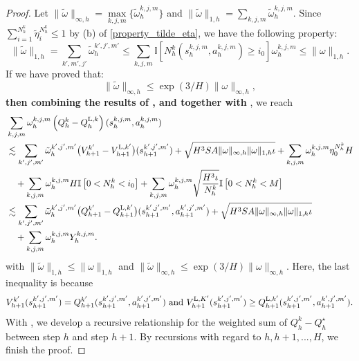 \documentclass{article}
\newcommand{\LL}{\textnormal{L}}
\begin{document}
\begin{proof}
Let $\|\tilde{\omega}\|_{\infty,h} = \mathop{\max}\limits_{k,j,m}\{\tilde{\omega}_{h}^{k, j, m}\}$ and $\|\tilde{\omega}\|_{1,h} = \sum_{k,j,m}\tilde{\omega}_{h}^{k, j, m}$. Since $\sum_{i = 1}^{N_h^k}\tilde{\eta}_i^{N_h^k} \leq 1$ by (b) of \cref{property_tilde_eta}, we have the following property:
\begin{equation*}
    \|\tilde{\omega}\|_{1,h} = \sum_{k',m',j'}\tilde{\omega}_{h}^{k',j',m'} \leq \sum_{k,j,m}\mathbb{I}\left[N_h^k(s_{h}^{k,j,m},a_{h}^{k,j,m}) \geq i_0 \right]\omega_{h}^{k,j,m} \leq \|\omega\|_{1,h}.
\end{equation*}
If we have proved that:
\begin{equation}
    \label{infty}
    \|\tilde{\omega}\|_{\infty,h} \leq \exp(3/H)\|\omega\|_{\infty,h},
\end{equation}
\textbf{then combining the results of ,  and  together with  }, we reach
\begin{align}
\label{Qrecur}
    &\sum_{k,j,m} \omega_{h}^{k,j,m} \left(Q_h^k - Q_h^{\LL,k}\right)(s_h^{k,j,m}, a_h^{k,j,m}) \nonumber\\
    &\lesssim \sum_{k',j',m'}\tilde{\omega}_{h}^{k',j',m'} \big(V_{h+1}^{k'} - V_{h+1}^{\LL,k'}\big)(s_{h+1}^{k',j',m'}) +\sqrt{H^3SA\|\omega\|_{\infty,h}\|\omega\|_{1,h}\iota} +\sum_{k,j,m} \omega_{h}^{k,j,m}\eta_0^{N_h^k}H \nonumber\\
    & \quad +\sum_{k,j,m} \omega_{h}^{k,j,m}H\mathbb{I}\left[0<N_h^k<i_0 \right] +\sum_{k,j,m} \omega_{h}^{k,j,m}\sqrt{\frac{H^3\iota}{N_h^k}}\mathbb{I}\left[ 0<N_h^k< M\right] \nonumber\\
    &\lesssim \sum_{k',j',m'}\tilde{\omega}_{h}^{k',j',m'} \big(Q_{h+1}^{k'} - Q_{h+1}^{\LL,k'}\big)(s_{h+1}^{k',j',m'},a_{h+1}^{k',j',m'}) +\sqrt{H^3SA\|\omega\|_{\infty,h}\|\omega\|_{1,h}\iota} \nonumber\\
    &\quad + \sum_{k,j,m} \omega_{h}^{k,j,m}Y_h^{k,j,m}.
\end{align}
with $\|\tilde{\omega}\|_{1,h} \leq \|\omega\|_{1,h}$ and $\|\tilde{\omega}\|_{\infty,h} \leq \exp(3/H)\|\omega\|_{\infty,h}$. Here, the last inequality is because
$$V_{h+1}^{k'} (s_{h+1}^{k',j',m'}) = Q_{h+1}^{k'}(s_{h+1}^{k',j',m'}, a_{h+1}^{k',j',m'}) \textnormal{ and } V_{h+1}^{\LL,K'} (s_{h+1}^{k',j',m'}) \geq Q_{h+1}^{\LL,k'}(s_{h+1}^{k',j',m'}, a_{h+1}^{k',j',m'}).$$
With , we develop a recursive relationship for the weighted sum of $Q_h^k - Q_h^{\star}$ between step $h$ and step $h+1$. By recursions with regard to $h, h+1,...,H$, we finish the proof.


\end{proof}
\end{document}
